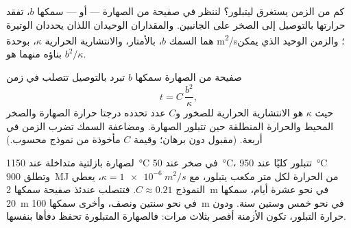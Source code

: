كم من الزمن يستغرق  ليتبلور؟ لننظر في صفيحة من
الصهارة ---  أو  --- سمكها $b$، تفقد حرارتها
بالتوصيل إلى الصخر على الجانبين. والمقداران الوحيدان اللذان يحددان
الوتيرة هما السمك $b$، بالأمتار، والانتشارية الحرارية $\kappa$،
بوحدة \unit{m^2/s}؛ والزمن الوحيد الذي يمكن بناؤه منهما هو $b^2/\kappa$.

\begin{proposition}\label{prop:g11:igneous-rocks:cooling}
صفيحة من الصهارة سمكها $b$ تبرد بالتوصيل تتصلب في
زمن
\[
  t = C\,\frac{b^2}{\kappa},
\]
حيث $\kappa$ هو الانتشارية الحرارية للصخور و$C$ عدد تحدده
درجتا حرارة الصهارة والصخر المحيط والحرارة
المنطلقة حين تتبلور الصهارة. ومضاعفة السمك تضرب
الزمن في أربعة. (مقبول دون برهان؛ وقيمة $C$ مأخوذة من نموذج محسوب.)
\end{proposition}

لصهارة بازلتية متداخلة عند \qty{1150}{\degreeCelsius} في صخر عند
\qty{50}{\degreeCelsius}، تتبلور كليًا عند
\qty{950}{\degreeCelsius} وتطلق \qty{900}{MJ} من الحرارة لكل متر
مكعب يتبلور، مع $\kappa = \qty{1e-6}{m^2/s}$، يعطي النموذج
$C \approx 0.21$. فتتصلب عندئذ صفيحة سمكها \qty{2}{m} في نحو عشرة
أيام،  سمكها \qty{20}{m} في نحو سنتين ونصف، وأخرى سمكها
\qty{100}{m} في نحو خمس وستين سنة. ودون حرارة
التبلور، تكون الأزمنة أقصر بثلاث مرات: فالصهارة المتبلورة
تحفظ دفأها بنفسها.

